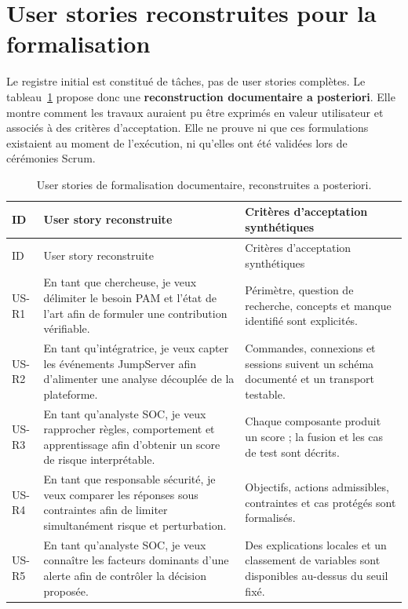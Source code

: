 \documentclass[11pt,a4paper,oneside]{report}
\theoremstyle{definition}
\theoremstyle{plain}
\begin{document}
\section{User stories reconstruites pour la formalisation}

Le registre initial est constitué de tâches, pas de user stories complètes.
Le tableau~\ref{tab:management-stories} propose donc une
\textbf{reconstruction documentaire a posteriori}. Elle montre comment les
travaux auraient pu être exprimés en valeur utilisateur et associés à des
critères d'acceptation. Elle ne prouve ni que ces formulations existaient au
moment de l'exécution, ni qu'elles ont été validées lors de cérémonies Scrum.

\begin{longtable}{@{}p{}p{}p{}@{}}
\caption{User stories de formalisation documentaire, reconstruites a posteriori.}
\label{tab:management-stories}\\
\toprule
ID & User story reconstruite & Critères d'acceptation synthétiques \\
\midrule
\endfirsthead
\toprule
ID & User story reconstruite & Critères d'acceptation synthétiques \\
\midrule
\endhead
US-R1 & En tant que chercheuse, je veux délimiter le besoin PAM et l'état de
l'art afin de formuler une contribution vérifiable. &
Périmètre, question de recherche, concepts et manque identifié sont explicités. \\
US-R2 & En tant qu'intégratrice, je veux capter les événements JumpServer afin
d'alimenter une analyse découplée de la plateforme. &
Commandes, connexions et sessions suivent un schéma documenté et un transport testable. \\
US-R3 & En tant qu'analyste SOC, je veux rapprocher règles, comportement et
apprentissage afin d'obtenir un score de risque interprétable. &
Chaque composante produit un score ; la fusion et les cas de test sont décrits. \\
US-R4 & En tant que responsable sécurité, je veux comparer les réponses sous
contraintes afin de limiter simultanément risque et perturbation. &
Objectifs, actions admissibles, contraintes et cas protégés sont formalisés. \\
US-R5 & En tant qu'analyste SOC, je veux connaître les facteurs dominants d'une
alerte afin de contrôler la décision proposée. &
Des explications locales et un classement de variables sont disponibles au-dessus du seuil fixé. \\

\end{longtable}
\end{document}
